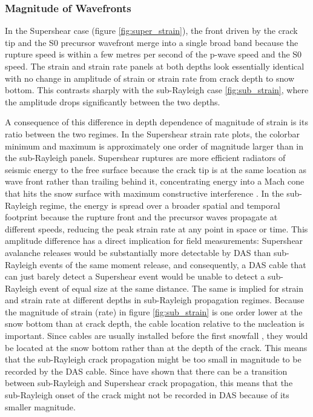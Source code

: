 \subsubsection{Magnitude of Wavefronts}

In the Supershear case (figure \ref{fig:super_strain}), the front driven by the crack tip and the S0 precursor wavefront merge into a single broad band because the rupture speed is within a few metres per second of the p-wave speed and the S0 speed. The strain and strain rate panels at both depths look essentially identical with no change in amplitude of strain or strain rate from crack depth to snow bottom. This contrasts sharply with the sub-Rayleigh case \ref{fig:sub_strain}, where the amplitude drops significantly between the two depths.\par

A consequence of this difference in depth dependence of magnitude of strain is its ratio between the two regimes. In the Supershear strain rate plots, the colorbar minimum and maximum is approximately one order of magnitude larger than in the sub-Rayleigh panels. Supershear ruptures are more efficient radiators of seismic energy to the free surface because the crack tip is at the same location as wave front rather than trailing behind it, concentrating energy into a Mach cone that hits the
snow surface with maximum constructive interference \parencite{dunhamNearsourceGroundMotion2005, rosakisIntersonicShearCracks2002}.
In the sub-Rayleigh regime, the energy is spread over a broader spatial and
temporal footprint because the rupture front and the precursor waves propagate at different speeds, reducing the peak strain rate at any point in space or time. This amplitude difference has a direct implication for field measurements: Supershear avalanche releases would be substantially more detectable by DAS than sub-Rayleigh events of the same moment release, and consequently, a DAS cable that can just barely detect a Supershear event would be unable to detect a sub-Rayleigh event of equal size at the same distance. The same is implied for strain and strain rate at different depths in sub-Rayleigh propagation regimes. Because the magnitude of strain (rate) in figure \ref{fig:sub_strain} is one order lower at the snow bottom than at crack depth, the cable location relative to the nucleation is important. Since cables are usually installed before the first snowfall \parencite{edmeFiberopticDetectionSnow2023,paitzPhenomenologyAvalancheRecordings2023}, they would be located at the snow bottom rather than at the depth of the crack. This means that the sub-Rayleigh crack propagation might be too small in magnitude to be recorded by the DAS cable. Since \cite{bergfeldSignaturesSubRayleighSupershear2025,sironTheoreticalFrameworkDynamic2023,trottetTransitionSubRayleighAnticrack2022, gaumeDynamicAnticrackPropagation2018} have shown that there can be a transition between sub-Rayleigh and Supershear crack propagation, this means that the sub-Rayleigh onset of the crack might not be recorded in DAS because of its smaller magnitude. \par



